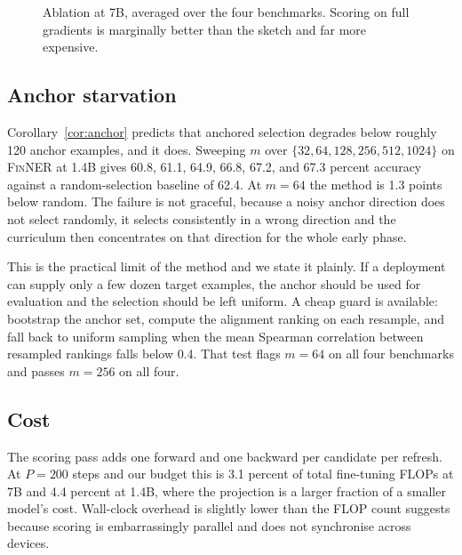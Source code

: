 \begin{figure}[t]
  \centering
  \caption{Ablation at 7B, averaged over the four benchmarks. Scoring on full
  gradients is marginally better than the sketch and far more expensive.}
  \label{fig:ablation}
\end{figure}

\subsection{Anchor starvation}

Corollary~\ref{cor:anchor} predicts that anchored selection degrades below
roughly 120 anchor examples, and it does. Sweeping $m$ over
$\{32, 64, 128, 256, 512, 1024\}$ on \textsc{FinNER} at 1.4B gives 60.8, 61.1,
64.9, 66.8, 67.2, and 67.3 percent accuracy against a random-selection baseline
of 62.4. At $m = 64$ the method is 1.3 points below random. The failure is not
graceful, because a noisy anchor direction does not select randomly, it selects
consistently in a wrong direction and the curriculum then concentrates on that
direction for the whole early phase.

This is the practical limit of the method and we state it plainly. If a
deployment can supply only a few dozen target examples, the anchor should be
used for evaluation and the selection should be left uniform. A cheap guard is
available: bootstrap the anchor set, compute the alignment ranking on each
resample, and fall back to uniform sampling when the mean Spearman correlation
between resampled rankings falls below 0.4. That test flags $m = 64$ on all
four benchmarks and passes $m = 256$ on all four.

\subsection{Cost}

The scoring pass adds one forward and one backward per candidate per refresh.
At $P = 200$ steps and our budget this is 3.1 percent of total fine-tuning
FLOPs at 7B and 4.4 percent at 1.4B, where the projection is a larger fraction
of a smaller model's cost. Wall-clock overhead is slightly lower than the FLOP
count suggests because scoring is embarrassingly parallel and does not
synchronise across devices.
